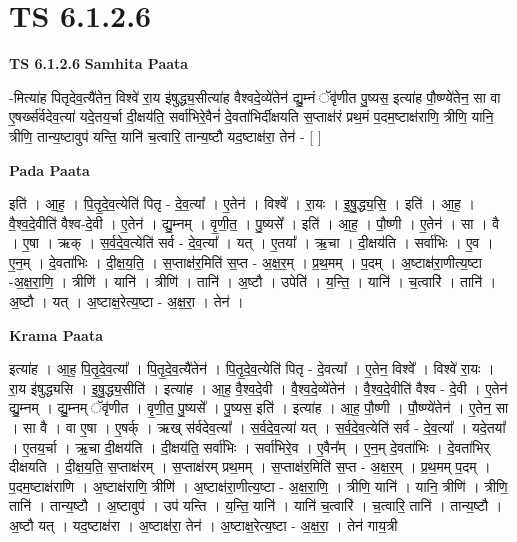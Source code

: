 \documentclass[17pt]{extarticle}
\begin{document}
\section{ TS 6.1.2.6 }

\textbf{TS 6.1.2.6 } \newline
\textbf{Samhita Paata} \newline

-मित्या॑ह पितृदेव॒त्यै॑तेन॒ विश्वे॑ रा॒य इ॑षुद्ध्य॒सीत्या॑ह वैश्वदे॒व्ये॑तेन॑ द्यु॒म्नं ॅवृ॑णीत पु॒ष्यस॒ इत्या॑ह पौ॒ष्ण्ये॑तेन॒ सा वा ए॒षर्ख्स॑र्वदेव॒त्या॑ यदे॒तय॒र्चा दी॒क्षय॑ति॒ सर्वा॑भिरे॒वैनं॑ दे॒वता॑भिर्दीक्षयति स॒प्ताक्ष॑रं प्रथ॒मं प॒दम॒ष्टाक्ष॑राणि॒ त्रीणि॒ यानि॒ त्रीणि॒ तान्य॒ष्टावुप॑ यन्ति॒ यानि॑ च॒त्वारि॒ तान्य॒ष्टौ यद॒ष्टाक्ष॑रा॒ तेन॑ - [  ] \newline

\textbf{Pada Paata} \newline

इति॑ । आ॒ह॒ । पि॒तृ॒दे॒व॒त्येति॑ पितृ - दे॒व॒त्या᳚ । ए॒तेन॑ । विश्वे᳚ । रा॒यः । इ॒षु॒द्ध्य॒सि॒ । इति॑ । आ॒ह॒ । वै॒श्व॒दे॒वीति॑ वैश्व-दे॒वी । ए॒तेन॑ । द्यु॒म्नम् । वृ॒णी॒त॒ । पु॒ष्यसे᳚ । इति॑ । आ॒ह॒ । पौ॒ष्णी । ए॒तेन॑ । सा । वै । ए॒षा । ऋक् । स॒र्व॒दे॒व॒त्येति॑ सर्व - दे॒व॒त्या᳚ । यत् । ए॒तया᳚ । ऋ॒चा । दी॒क्षय॑ति । सर्वा॑भिः । ए॒व । ए॒न॒म् । दे॒वता॑भिः । दी॒क्ष॒य॒ति॒ । स॒प्ताक्ष॑र॒मिति॑ स॒प्त - अ॒क्ष॒र॒म् । प्र॒थ॒मम् । प॒दम् । अ॒ष्टाक्ष॑रा॒णीत्य॒ष्टा -अ॒क्ष॒रा॒णि॒ । त्रीणि॑ । यानि॑ । त्रीणि॑ । तानि॑ । अ॒ष्टौ । उपेति॑ । य॒न्ति॒ । यानि॑ । च॒त्वारि॑ । तानि॑ । अ॒ष्टौ । यत् । अ॒ष्टाक्ष॒रेत्य॒ष्टा - अ॒क्ष॒रा॒ । तेन॑ ।  \newline


\textbf{Krama Paata} \newline

इत्या॑ह । आ॒ह॒ पि॒तृ॒दे॒व॒त्या᳚ । पि॒तृ॒दे॒व॒त्यै॑तेन॑ । पि॒तृ॒दे॒व॒त्येति॑ पितृ - दे॒वत्या᳚ । ए॒तेन॒ विश्वे᳚ । विश्वे॑ रा॒यः । रा॒य इ॑षुद्ध्यसि । इ॒षु॒द्ध्य॒सीति॑ । इत्या॑ह । आ॒ह॒ वै॒श्व॒दे॒वी । वै॒श्व॒दे॒व्ये॑तेन॑ । वै॒श्व॒दे॒वीति॑ वैश्व - दे॒वी । ए॒तेन॑ द्यु॒म्नम् । द्यु॒म्नम् ॅवृ॑णीत । वृ॒णी॒त॒ पु॒ष्यसे᳚ । पु॒ष्यस॒ इति॑ । इत्या॑ह । आ॒ह॒ पौ॒ष्णी । पौ॒ष्ण्ये॑तेन॑ । ए॒तेन॒ सा । सा वै । वा ए॒षा । ए॒षर्क् । ऋख् स॑र्वदेव॒त्या᳚ । स॒र्व॒दे॒व॒त्या॑ यत् । स॒र्व॒दे॒व॒त्येति॑ सर्व - दे॒व॒त्या᳚ । यदे॒तया᳚ । ए॒तय॒र्चा । ऋ॒चा दी॒क्षय॑ति । दी॒क्षय॑ति॒ सर्वा॑भिः । सर्वा॑भिरे॒व । ए॒वैन᳚म् । ए॒न॒म् दे॒वता॑भिः । दे॒वता॑भिर् दीक्षयति । दी॒क्ष॒य॒ति॒ स॒प्ताक्ष॑रम् । स॒प्ताक्ष॑रम् प्रथ॒मम् । स॒प्ताक्ष॑र॒मिति॑ स॒प्त - अ॒क्ष॒र॒म् । प्र॒थ॒मम् प॒दम् । प॒दम॒ष्टाक्ष॑राणि । अ॒ष्टाक्ष॑राणि॒ त्रीणि॑ । अ॒ष्टाक्ष॑रा॒णीत्य॒ष्टा - अ॒क्ष॒रा॒णि॒ । त्रीणि॒ यानि॑ । यानि॒ त्रीणि॑ । त्रीणि॒ तानि॑ । तान्य॒ष्टौ । अ॒ष्टावुप॑ । उप॑ यन्ति । य॒न्ति॒ यानि॑ । यानि॑ च॒त्वारि॑ । च॒त्वारि॒ तानि॑ । तान्य॒ष्टौ । अ॒ष्टौ यत् । यद॒ष्टाक्ष॑रा । अ॒ष्टाक्ष॑रा॒ तेन॑ । अ॒ष्टाक्ष॒रेत्य॒ष्टा - अ॒क्ष॒रा॒ । तेन॑ गाय॒त्री \newline
\end{document}
